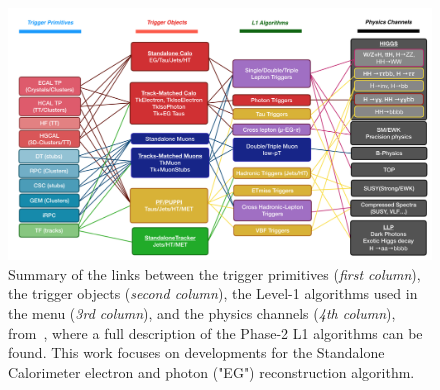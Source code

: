\begin{figure}[ht]
    \centering
    \includegraphics[width=15cm]{figures/ch-3-phase2/phase-2-summary-trigger-TP-algo-physics.png}
    \caption[Summary of the links between the trigger primitives, the trigger objects, the Level-1 algorithms, and the physics channels in the Phase-2 menu.]{Summary of the links between the trigger primitives (\textit{first column}), the trigger objects (\textit{second column}), the Level-1 algorithms used in the menu (\textit{3rd column}), and the physics channels (\textit{4th column}), from~\cite{CMS-TDR-021}, where a full description of the Phase-2 L1 algorithms can be found. This work focuses on developments for the Standalone Calorimeter electron and photon ("EG") reconstruction algorithm.}
    \label{fig:phase-2-summary-trigger-TP-algo-physics}
\end{figure}

